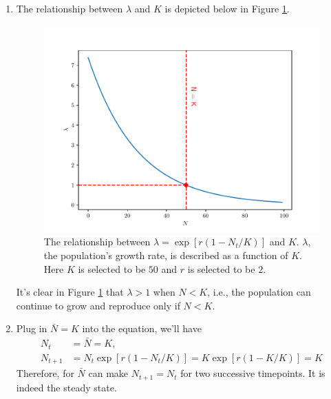 \begin{homeworkProblem}[4]
\begin{enumerate}
\item The relationship between $\lambda$ and $K$ is depicted below in Figure
\ref{fig:fig4a}.
\begin{figure}
    \centering
    \caption[The relationship between $\lambda$]{
        The relationship between $\lambda = \exp[r(1-N_t/K)]$ and $K$.
        $\lambda$, the population's growth rate, is described as a function of
        $K$. Here $K$ is selected to be $50$ and $r$ is selected to be $2$.
    }
    \label{fig:fig4a}
    \includegraphics[scale=0.6]{../fig/fig4(a).pdf}
\end{figure}
It's clear in Figure \ref{fig:fig4a} that $\lambda > 1$ when $N < K$, i.e., the
population can continue to grow and reproduce only if $N < K$.

\item Plug in $\bar N = K$ into the equation, we'll have \[
    \begin{aligned}
        N_t &= \bar N = K,\\
        N_{t+1} &= N_t \exp[r(1-N_t/K)] = K \exp[r(1-K/K)] = K
    \end{aligned}
\]
Therefore, for $\bar N$ can make $N_{t+1} = N_t$ for two successive timepoints.
It is indeed the steady state.


\end{enumerate}
\end{homeworkProblem}
